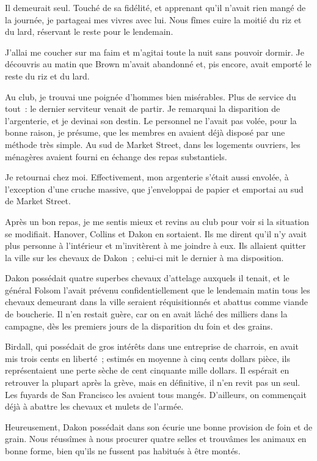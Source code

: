 \documentclass[french,twoside]{book} %
\begin{document}
\noindent Il demeurait seul. Touché de sa fidélité, et apprenant qu’il n’avait rien mangé de la journée, je partageai mes vivres avec lui. Nous fîmes cuire la moitié du riz et du lard, réservant le reste pour le lendemain.\par
J’allai me coucher sur ma faim et m’agitai toute la nuit sans pouvoir dormir. Je découvris au matin que Brown m’avait abandonné et, pis encore, avait emporté le reste du riz et du lard.\par
Au club, je trouvai une poignée d’hommes bien misérables. Plus de service du tout : le dernier serviteur venait de partir. Je remarquai la disparition de l’argenterie, et je devinai son destin. Le personnel ne l’avait pas volée, pour la bonne raison, je présume, que les membres en avaient déjà disposé par une méthode très simple. Au sud de Market Street, dans les logements ouvriers, les ménagères avaient fourni en échange des repas substantiels.\par
Je retournai chez moi. Effectivement, mon argenterie s’était aussi envolée, à l’exception d’une cruche massive, que j’enveloppai de papier et emportai au sud de Market Street.\par
Après un bon repas, je me sentis mieux et revins au club pour voir si la situation se modifiait. Hanover, Collins et Dakon en sortaient. Ils me dirent qu’il n’y avait plus personne à l’intérieur et m’invitèrent à me joindre à eux. Ils allaient quitter la ville sur les chevaux de Dakon ; celui-ci mit le dernier à ma disposition.\par
Dakon possédait quatre superbes chevaux d’attelage auxquels il tenait, et le général Folsom l’avait prévenu confidentiellement que le lendemain matin tous les chevaux demeurant dans la ville seraient réquisitionnés et abattus comme viande de boucherie. Il n’en restait guère, car on en avait lâché des milliers dans la campagne, dès les premiers jours de la disparition du foin et des grains.\par
Birdall, qui possédait de gros intérêts dans une entreprise de charrois, en avait mis trois cents en liberté ; estimés en moyenne à cinq cents dollars pièce, ils représentaient une perte sèche de cent cinquante mille dollars. Il espérait en retrouver la plupart après la grève, mais en définitive, il n’en revit pas un seul. Les fuyards de San Francisco les avaient tous mangés. D’ailleurs, on commençait déjà à abattre les chevaux et mulets de l’armée.\par
Heureusement, Dakon possédait dans son écurie une bonne provision de foin et de grain. Nous réussîmes à nous procurer quatre selles et trouvâmes les animaux en bonne forme, bien qu’ils ne fussent pas habitués à être montés.\par
\end{document}
